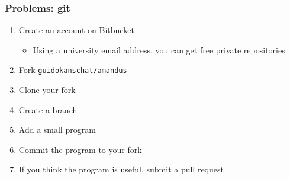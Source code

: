 \begin{frame}
  \frametitle{Problems: git}
  \begin{enumerate}
  \item Create an account on Bitbucket
    \begin{itemize}
    \item Using a university email address, you can get free private
      repositories
    \end{itemize}
  \item Fork \texttt{guidokanschat/amandus}
  \item Clone your fork
  \item Create a branch
  \item Add a small program
  \item Commit the program to your fork
  \item If you think the program is useful, submit a pull request
  \end{enumerate}
\end{frame}